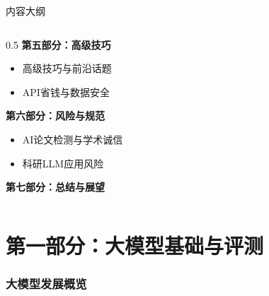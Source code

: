 \documentclass[aspectratio=169,11pt]{beamer}
\begin{document}
\begin{frame}{内容大纲}
\begin{columns}[T]
\begin{column}{0.5\textwidth}
            \textbf{第五部分：高级技巧}
            \begin{itemize}
                \item 高级技巧与前沿话题
                \item API省钱与数据安全
            \end{itemize}
            
            \textbf{第六部分：风险与规范}
            \begin{itemize}
                \item AI论文检测与学术诚信
                \item 科研LLM应用风险
            \end{itemize}
            
            \textbf{第七部分：总结与展望}
        \end{column}
    \end{columns}
\end{frame}

\part{第一部分：大模型基础与评测}

\section{大模型发展概览}
\end{document}

